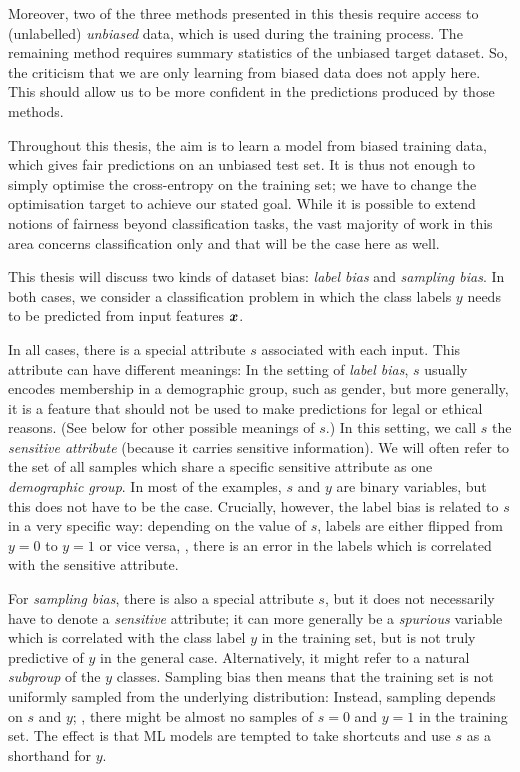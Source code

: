 Moreover, two of the three methods presented in this thesis require access to (unlabelled) \emph{unbiased} data,
which is used during the training process.
The remaining method requires summary statistics of the unbiased target dataset.
So, the criticism that we are only learning from biased data does not apply here.
This should allow us to be more confident in the predictions produced by those methods.

Throughout this thesis, the aim is to learn a model from biased training data,
which gives fair predictions on an unbiased test set.
It is thus not enough to simply optimise the cross-entropy on the training set;
we have to change the optimisation target to achieve our stated goal.
While it is possible to extend notions of fairness beyond classification tasks,
the vast majority of work in this area concerns classification only and that will be the case here as well.

This thesis will discuss two kinds of dataset bias: \emph{label bias} and \emph{sampling bias}.
In both cases,
we consider a classification problem in which the class labels $y$ needs to be predicted from input features ${\bm{x}}$.

In all cases, there is a special attribute $s$ associated with each input.
This attribute can have different meanings:
In the setting of \emph{label bias}, $s$ usually encodes membership in a demographic group, such as gender,
but more generally, it is a feature that should not be used to make predictions for legal or ethical reasons.
(See below for other possible meanings of $s$.)
In this setting, we call $s$ the \emph{sensitive attribute} (because it carries sensitive information).
We will often refer to the set of all samples which share a specific sensitive attribute as one \emph{demographic group}.
In most of the examples, $s$ and $y$ are binary variables, but this does not have to be the case.
Crucially, however, the label bias is related to $s$ in a very specific way:
depending on the value of $s$, labels are either flipped from $y=0$ to $y=1$ or vice versa,
\ie, there is an error in the labels which is correlated with the sensitive attribute.

For \emph{sampling bias},
there is also a special attribute $s$, but it does not necessarily have to denote a \emph{sensitive} attribute;
it can more generally be a \emph{spurious} variable which is correlated with the class label $y$ in the training set,
but is not truly predictive of $y$ in the general case.
Alternatively, it might refer to a natural \emph{subgroup} of the $y$ classes.
Sampling bias then means that the training set is not uniformly sampled from the underlying distribution:
Instead, sampling depends on $s$ and $y$;
\eg, there might be almost no samples of $s=0$ and $y=1$ in the training set.
The effect is that \ac{ML} models are tempted to take shortcuts and use $s$ as a shorthand for $y$.

